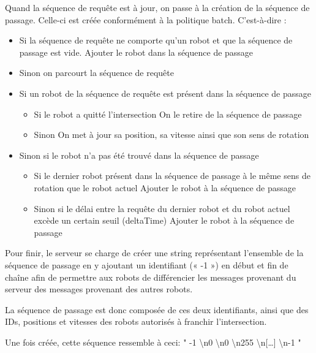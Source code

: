 \documentclass[french,a4paper,12pt]{report}
\begin{document}
Quand la séquence de requête est à jour, on passe à la création de la séquence de passage. Celle-ci est créée conformément à la politique batch. C’est-à-dire :
\begin{itemize}
\item Si la séquence de requête ne comporte qu’un robot et que la séquence de passage est vide.
	Ajouter le robot dans la séquence de passage
	
\item Sinon on parcourt la séquence de requête

\item Si un robot de la séquence de requête est présent dans la séquence de passage
	\begin{itemize}
	\item Si le robot a quitté l’intersection
		On le retire de la séquence de passage
		
	\item Sinon
		On met à jour sa position, sa vitesse ainsi que son sens de rotation
	\end{itemize}
	
\item Sinon si le robot n’a pas été trouvé dans la séquence de passage
	\begin{itemize}
	\item Si le dernier robot présent dans la séquence de passage à le même sens de rotation que le robot actuel
		Ajouter le robot à la séquence de passage
		
	\item Sinon si le délai entre la requête du dernier robot et du robot actuel excède un certain seuil (deltaTime)
		Ajouter le robot à la séquence de passage
	\end{itemize}	
\end{itemize}

Pour finir, le serveur se charge de créer une string représentant l’ensemble de la séquence de passage en y ajoutant un identifiant (« -1 ») en début et fin de chaîne afin de permettre aux robots de différencier les messages provenant du serveur des messages provenant des autres robots.

La séquence de passage est donc composée de ces deux identifiants, ainsi que des IDs, positions et vitesses des robots autorisés à franchir l’intersection. 

Une fois créée, cette séquence ressemble à ceci: " -1 \textbackslash n0 \textbackslash n0 \textbackslash n255 \textbackslash n[…] \textbackslash n-1 " \newline
 
\end{document}
